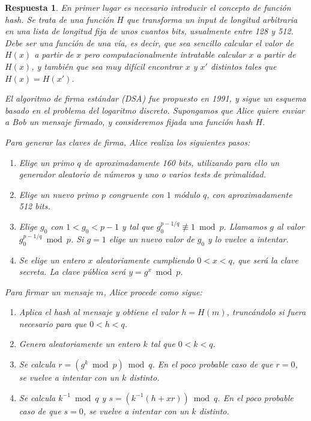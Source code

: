 \documentclass[
  a4paper,
  spanish,
  12pt,
]{scrartcl}
\theoremstyle{ejercicio-style}
\theoremstyle{remark-style}
\newtheorem*{sol}{Respuesta}
\theoremstyle{teorema-style}
\begin{document}
\begin{sol}
  En primer lugar es necesario introducir el concepto de \textit{función hash}. Se trata de una función $H$ que transforma un \textit{input} de longitud arbitraria en una lista de longitud fija de unos cuantos bits, usualmente entre 128 y 512. Debe ser una función de una vía, es decir, que sea sencillo calcular el valor de $H(x)$ a partir de $x$ pero computacionalmente intratable calcular $x$ a partir de $H(x)$, y también que sea muy difícil encontrar $x$ y $x'$ distintos tales que $H(x)=H(x')$.

  El algoritmo de firma estándar (DSA) fue propuesto en 1991, y sigue un esquema basado en el problema del logaritmo discreto. Supongamos que Alice quiere enviar a Bob un mensaje firmado, y consideremos fijada una función hash $H$.

  Para generar las claves de firma, Alice realiza los siguientes pasos:

  \begin{enumerate}
    \item Elige un primo $q$ de aproximadamente 160 bits, utilizando para ello un generador aleatorio de números y uno o varios tests de primalidad.
    \item Elige un nuevo primo $p$ congruente con $1$ módulo $q$, con aproximadamente 512 bits.
    \item Elige $g_0$ con $1 < g_0 < p-1$ y tal que $g_0 ^{p-1/q} \not\equiv 1 \bmod p$. Llamamos $g$ al valor  $g_0 ^{p-1/q} \bmod p$. Si $g=1$ elige un nuevo valor de $g_0$ y lo vuelve a intentar.
    \item Se elige un entero $x$ aleatoriamente cumpliendo $0 < x < q$, que será la clave secreta. La clave pública será $y = g^x \bmod p$.
  \end{enumerate}

  Para firmar un mensaje $m$, Alice procede como sigue:
  \begin{enumerate}
    \item Aplica el hash al mensaje y obtiene el valor $h = H(m)$, truncándolo si fuera necesario para que $0 < h < q$.
    \item Genera aleatoriamente un entero $k$ tal que $0 < k < q$.
    \item Se calcula $r=(g^k \bmod p) \bmod q$. En el poco probable caso de que $r=0$, se vuelve a intentar con un $k$ distinto.
    \item Se calcula $k^{-1} \bmod q$ y $s = (k^{-1}(h + xr)) \bmod q$. En el poco probable caso de que $s=0$, se vuelve a intentar con un $k$ distinto.
  \end{enumerate}


\end{sol}
\end{document}
